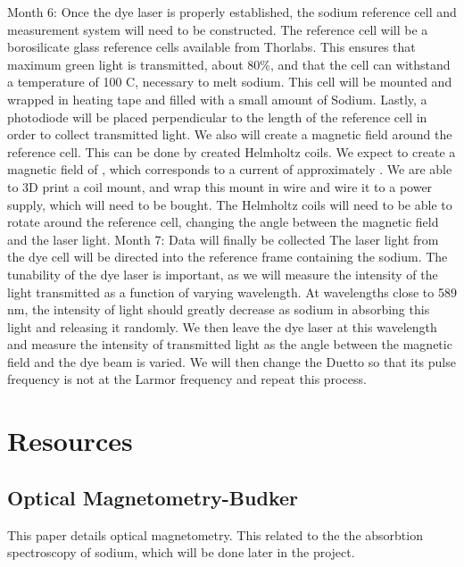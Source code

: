 \documentclass{article}
\begin{document}
Month 6: Once the dye laser is properly established, the sodium reference cell and measurement system will need to be constructed. The reference cell will be a borosilicate glass reference cells available from Thorlabs. This ensures that maximum green light is transmitted, about 80$\%$, and that the cell can withstand a temperature of 100 C, necessary to melt sodium. This cell will be mounted and wrapped in heating tape and filled with a small amount of Sodium. Lastly, a photodiode will be placed perpendicular to the length of the reference cell in order to collect transmitted light. We also will create a magnetic field around the reference cell. This can be done by created Helmholtz coils. We expect to create a magnetic field of , which corresponds to a current of approximately . We are able to 3D print a coil mount, and wrap this mount in wire and wire it to a power supply, which will need to be bought. The Helmholtz coils will need to be able to rotate around the reference cell, changing the angle between the magnetic field and the laser light.
Month 7: Data will finally be collected The laser light from the dye cell will be directed into the reference frame containing the sodium. The tunability of the dye laser is important, as we will measure the intensity of the light transmitted as a function of varying wavelength. At wavelengths close to 589 nm, the intensity of light should greatly decrease as sodium in absorbing this light and releasing it randomly. We then leave the dye laser at this wavelength and measure the intensity of transmitted light as the angle between the magnetic field and the dye beam is varied. We will then change the Duetto so that its pulse frequency is not at the Larmor frequency and repeat this process.
	 




\pagebreak

\section{Resources}
\subsection{Optical Magnetometry-Budker}
This paper details optical magnetometry. This related to the the absorbtion spectroscopy of sodium, which will be done later in the project.
\pagebreak


\end{document}
